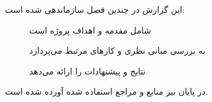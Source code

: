 این گزارش در چندین فصل سازماندهی شده است:

\begin{description}
    \item[] شامل مقدمه و اهداف پروژه است
    \item[] به بررسی مبانی نظری و کارهای مرتبط می‌پردازد
    \item[] نتایج و پیشنهادات را ارائه می‌دهد
\end{description}

در پایان نیز منابع و مراجع استفاده شده آورده شده است.

